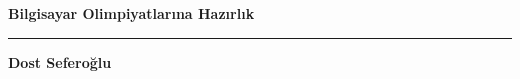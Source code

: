 \documentclass[11pt, twoside, openany]{book}
\begin{document}
\begin{titlepage}
  \centering
  \null
  \vfill
  {\Huge\bfseries Bilgisayar Olimpiyatlarına Hazırlık\par}
  \vspace{1.2em}
  {\color{black!60}\rule{0.5\textwidth}{0.6pt}\par}
  \vfill
  {\large\bfseries Dost Seferoğlu\par}
  \vfill
\end{titlepage}






\tableofcontents
\clearpage

\end{document}
